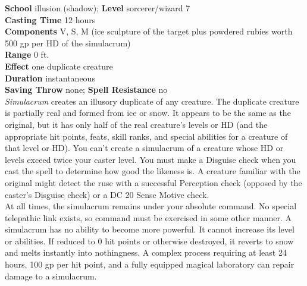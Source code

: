 \textbf{School} illusion (shadow); \textbf{Level} sorcerer/wizard 7\\
\textbf{Casting Time} 12 hours\\
\textbf{Components} V, S, M (ice sculpture of the target plus powdered rubies worth 500 gp per HD of the simulacrum)\\
\textbf{Range} 0 ft.\\
\textbf{Effect} one duplicate creature\\
\textbf{Duration} instantaneous\\
\textbf{Saving Throw} none; \textbf{Spell Resistance} no\\
\textit{Simulacrum }creates an illusory duplicate of any creature. The duplicate creature is partially real and formed from ice or snow. It appears to be the same as the original, but it has only half of the real creature's levels or HD (and the appropriate hit points, feats, skill ranks, and special abilities for a creature of that level or HD). You can't create a simulacrum of a creature whose HD or levels exceed twice your caster level. You must make a Disguise check when you cast the spell to determine how good the likeness is. A creature familiar with the original might detect the ruse with a successful Perception check (opposed by the caster's Disguise check) or a DC 20 Sense Motive check.\\
At all times, the simulacrum remains under your absolute command. No special telepathic link exists, so command must be exercised in some other manner. A simulacrum has no ability to become more powerful. It cannot increase its level or abilities. If reduced to 0 hit points or otherwise destroyed, it reverts to snow and melts instantly into nothingness. A complex process requiring at least 24 hours, 100 gp per hit point, and a fully equipped magical laboratory can repair damage to a simulacrum.\\
